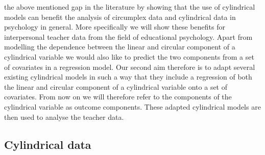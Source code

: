 \documentclass[man]{apa6}
\begin{document}
the above mentioned gap in the literature by showing that the use of cylindrical
models can benefit the analysis of circumplex data and cylindrical data in
psychology in general. More specifically we will show these benefits for
interpersonal teacher data from the field of educational psychology. Apart from
modelling the dependence between the linear and circular component of a
cylindrical variable we would also like to predict the two components from a set
of covariates in a regression model. Our second aim therefore is to adapt
several existing cylindrical models in such a way that they include a regression
of both the linear and circular component of a cylindrical variable onto a set
of covariates. From now on we will therefore refer to the components of the
cylindrical variable as outcome components. These adapted cylindrical models are
then used to analyse the teacher data.

\subsection{Cylindrical data}
\end{document}
